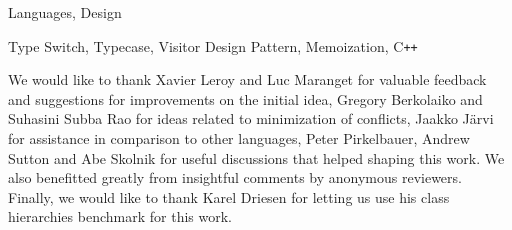 \documentclass[preprint,10pt]{sigplanconf}
\DeclareRobustCommand{\Cpp}{C\texttt{++}}
\begin{document}
\begin{abstract}
%
\end{abstract}


\terms
Languages, Design

\keywords
Type Switch, Typecase, Visitor Design Pattern, Memoization, \Cpp{}




%
%





\acks

We would like to thank Xavier Leroy and Luc Maranget for valuable feedback and 
suggestions for improvements on the initial idea, Gregory Berkolaiko and 
Suhasini Subba Rao for ideas related to minimization of conflicts, Jaakko 
J\"arvi for assistance in comparison to other languages, Peter Pirkelbauer, 
Andrew Sutton and Abe Skolnik for useful discussions that helped shaping this 
work. We also benefitted greatly from insightful comments by anonymous 
reviewers. Finally, we would like to thank Karel Driesen for letting us use his 
class hierarchies benchmark for this work.



\end{document}
